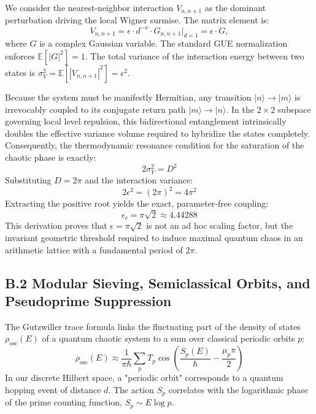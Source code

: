 \documentclass[prl,aps,floatfix,superscriptaddress,10pt]{revtex4-2}
\begin{document}
We consider the nearest-neighbor interaction $V_{n, n+1}$ as the dominant perturbation driving the local Wigner surmise. The matrix element is:
\begin{equation}
V_{n, n+1} = \epsilon \cdot d^{-\nu} \cdot G_{n, n+1} \bigg|_{d=1} = \epsilon \cdot G,
\end{equation}
where $G$ is a complex Gaussian variable. The standard GUE normalization enforces $\mathbb{E}[|G|^2] = 1$. The total variance of the interaction energy between two states is $\sigma_V^2 = \mathbb{E}[|V_{n, n+1}|^2] = \epsilon^2$.

Because the system must be manifestly Hermitian, any transition $|n\rangle \to |m\rangle$ is irrevocably coupled to its conjugate return path $|m\rangle \to |n\rangle$. In the $2 \times 2$ subspace governing local level repulsion, this bidirectional entanglement intrinsically doubles the effective variance volume required to hybridize the states completely. Consequently, the thermodynamic resonance condition for the saturation of the chaotic phase is exactly:
\begin{equation}
2 \sigma_V^2 = D^2
\end{equation}
Substituting $D = 2\pi$ and the interaction variance:
\begin{equation}
2 \epsilon^2 = (2\pi)^2 = 4\pi^2
\end{equation}
Extracting the positive root yields the exact, parameter-free coupling:
\begin{equation}
\epsilon_c = \pi\sqrt{2} \approx 4.44288
\end{equation}
This derivation proves that $\epsilon = \pi\sqrt{2}$ is not an ad hoc scaling factor, but the invariant geometric threshold required to induce maximal quantum chaos in an arithmetic lattice with a fundamental period of $2\pi$.

\subsection{B.2 Modular Sieving, Semiclassical Orbits, and Pseudoprime Suppression}

The Gutzwiller trace formula links the fluctuating part of the density of states $\rho_{\text{osc}}(E)$ of a quantum chaotic system to a sum over classical periodic orbits $p$:
\begin{equation}
\rho_{\text{osc}}(E) \approx \frac{1}{\pi \hbar} \sum_p T_p \cos\left( \frac{S_p(E)}{\hbar} - \frac{\mu_p \pi}{2} \right)
\end{equation}
In our discrete Hilbert space, a "periodic orbit" corresponds to a quantum hopping event of distance $d$. The action $S_p$ correlates with the logarithmic phase of the prime counting function, $S_p \sim E \log p$.
\end{document}
